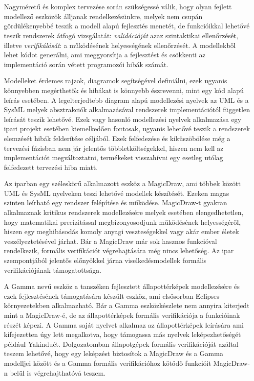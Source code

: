 \chapter{\bevezetes}


Nagyméretű és komplex tervezése során szükségessé válik, hogy olyan fejlett modellező eszközök álljanak rendelkezésünkre, melyek nem csupán gördülékenyebbé teszik a modell alapú fejlesztés menetét, de funkcióikkal lehetővé teszik rendszerek átfogó vizsgálatát: \emph{validációját} azaz szintaktikai ellenőrzését, illetve \emph{verifikálását}: a működésének helyességének ellenőrzését. A modellekből lehet kódot generálni, ami meggyorsítja a fejlesztést és csökkenti az implementáció során vétett programozói hibák számát.

Modelleket érdemes rajzok, diagramok segítségével definiálni, ezek ugyanis könnyebben megérthetők és hibákat is könnyebb észrevenni, mint egy kód alapú leírás esetében. A legelterjedtebb diagram alapú modellezési nyelvek az UML és a SysML melyek absztrakciók alkalmazásával rendszerek implementációtól független leírását teszik lehetővé. Ezek vagy hasonló modellezési nyelvek alkalmazása egy ipari projekt esetében kiemelkedően fontosak, ugyanis lehetővé teszik a rendszerek elemzését hibák felderítése céljából. Ezek felfedezése és kiküszöbölése még a tervezési fázisban nem jár jelentős többletköltségekkel, hiszen nem kell az implementációt megváltoztatni, termékeket visszahívni egy esetleg utólag felfedezett tervezési hiba miatt.

Az iparban egy széleskörű alkalmazott eszköz a MagicDraw, ami többek között UML és SysML nyelveken teszi lehetővé modellek készítését. Ezeken magas szinten leírható egy rendszer felépítése és működése. MagicDraw-t gyakran alkalmaznak kritikus rendszerek modellezésére melyek esetében elengedhetetlen, hogy matematikai precizitással megbizonyosodjunk működésének helyességéről, hiszen egy meghibásodás komoly anyagi veszteségekkel vagy akár ember életek veszélyeztetésével járhat. Bár a MagicDraw már sok hasznos funkcióval rendelkezik, formális verifikációt végrehajtására még nincs lehetőség. Az ipar szempontjából jelentős előnyökkel járna viselkedésmodellek formális verifikációjának támogatottsága.

A Gamma nevű eszköz a tanszéken fejlesztett állapottérképek modellezésére és ezek fejlesztésének támogatására készült eszköz, ami elsősorban Eclipses környezetekben alkalmazható. Bár a Gamma eszközkészlete nem annyira kiterjedt mint a MagicDraw-é, de az állapottérképek formális verifikációja a funkcióinak részét képezi. A Gamma saját nyelvet alkalmaz az állapottérképek leírására ami kifejezetten úgy lett megalkotva, hogy támogassa más nyelvek leképezhetőségét például Yakinduét. Dolgozatomban állapotgépek formális verifikációját azáltal teszem lehetővé, hogy egy leképzést biztosítok a MagicDraw és a Gamma modelljei között és a Gamma formális verifikációhoz kötődő funkcióit MagicDraw-n belül is végrehajthatóvá teszem.



